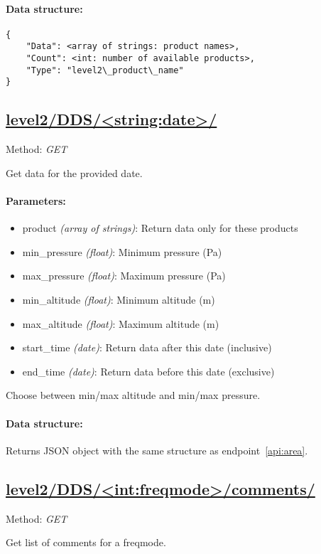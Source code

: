 \paragraph{Data structure:}
\begin{lstlisting}
{
	"Data": <array of strings: product names>,
  	"Count": <int: number of available products>,
	"Type": "level2\_product\_name"
}
\end{lstlisting}


\subsection{\url{level2/DDS/<string:date>/}}
Method: \emph{GET}

Get data for the provided date.

\paragraph{Parameters:}
\begin{itemize}
    \item product \emph{(array of strings)}: Return data only for these
        products
    \item min\_pressure \emph{(float)}: Minimum pressure (Pa)
    \item max\_pressure \emph{(float)}: Maximum pressure (Pa)
    \item min\_altitude \emph{(float)}: Minimum altitude (m)
    \item max\_altitude \emph{(float)}: Maximum altitude (m)
    \item start\_time \emph{(date)}: Return data after this date (inclusive)
    \item end\_time \emph{(date)}: Return data before this date (exclusive)
\end{itemize}

Choose between min/max altitude and min/max pressure.

\paragraph{Data structure:}
Returns JSON object with the same structure as endpoint~\ref{api:area}.


\subsection{\url{level2/DDS/<int:freqmode>/comments/}}
Method: \emph{GET}

Get list of comments for a freqmode.

